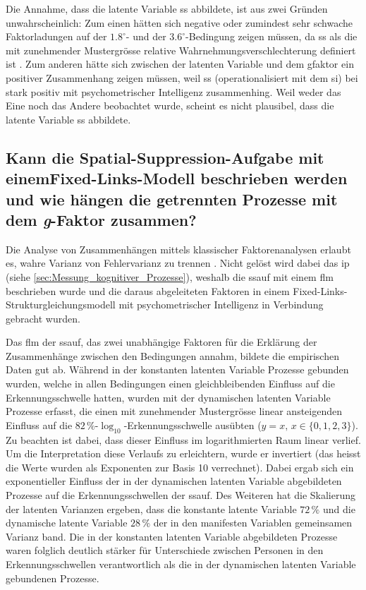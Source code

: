 \documentclass[11pt, twoside, a4paper]{book}		%
\begin{document}
Die Annahme, dass die latente Variable \gls{ss} abbildete, ist aus zwei Gründen unwahrscheinlich: Zum einen hätten sich negative oder zumindest sehr schwache Faktorladungen auf der $1.8^{\circ}$- und der $3.6^{\circ}$-Bedingung zeigen müssen, da \gls{ss} als die mit zunehmender Mustergrösse relative  Wahrnehmungsverschlechterung definiert ist \citep{Melnick2013, Tadin2003, Tadin2006, Tadin2011}. Zum anderen hätte sich zwischen der latenten Variable und dem \gls{gfaktor} ein positiver Zusammenhang zeigen müssen, weil \gls{ss} (operationalisiert mit dem \gls{si}) bei \citet{Melnick2013} stark positiv mit psychometrischer Intelligenz zusammenhing.
Weil weder das Eine noch das Andere beobachtet wurde, scheint es nicht plausibel, dass die latente Variable \gls{ss} abbildete.



\subsection{Kann die Spa\-tial-Sup\-pres\-sion-Auf\-gabe mit einem\break Fixed-Links-Mo\-dell beschrieben werden und wie hängen die getrennten Prozesse mit dem \textit{g}-Faktor zusammen?}

Die Analyse von Zusammenhängen mittels klassischer Faktorenanalysen erlaubt es, wahre Varianz von Fehlervarianz zu trennen \citep[S. 9]{Kline2011}.
Nicht gelöst wird dabei das \gls{ip} (siehe \autoref{sec:Messung_kognitiver_Prozesse}), weshalb die \gls{ssauf} mit einem \gls{flm} \citep[z.~B.][]{Schweizer2006a, Schweizer2006b, Schweizer2007, Schweizer2008, Schweizer2009a} beschrieben wurde und die daraus abgeleiteten Faktoren in einem Fixed-Links-Struk\-tur\-glei\-chungs\-mo\-dell mit psychometrischer Intelligenz in Verbindung gebracht wurden.

Das \gls{flm} der \gls{ssauf}, das zwei unabhängige Faktoren für die Erklärung der Zusammenhänge zwischen den Bedingungen annahm, bildete die empirischen Daten  gut ab. 
Während in der konstanten latenten Variable Prozesse gebunden wurden, welche in allen Bedingungen einen gleichbleibenden Einfluss auf die Er\-ken\-nungs\-schwel\-le hatten, wurden mit der dynamischen latenten Variable Prozesse erfasst, die einen mit zunehmender Mustergrösse linear ansteigenden Einfluss auf die $82\,\%$-$\log_{10}$-Er\-ken\-nungs\-schwel\-le ausübten ($y=x,\,x\in\{0, 1, 2, 3\}$).
Zu beachten ist dabei, dass dieser Einfluss im logarithmierten Raum linear verlief. Um die Interpretation diese Verlaufs zu erleichtern, wurde er invertiert (das heisst die Werte wurden als Exponenten zur Basis 10 verrechnet).
Dabei ergab sich ein exponentieller Einfluss der in der dynamischen latenten Variable abgebildeten Prozesse auf die Erkennungsschwellen der \gls{ssauf}. Des Weiteren hat die Skalierung der latenten Varianzen ergeben, dass die konstante latente Variable $72\,\%$ und die dynamische latente Variable $28\,\%$ der in den manifesten Variablen gemeinsamen Varianz band. 
Die in der konstanten latenten Variable abgebildeten Prozesse waren folglich deutlich stärker für Unterschiede zwischen Personen in den Erkennungsschwellen verantwortlich als die in der dynamischen latenten Variable gebundenen Prozesse.
\end{document}
